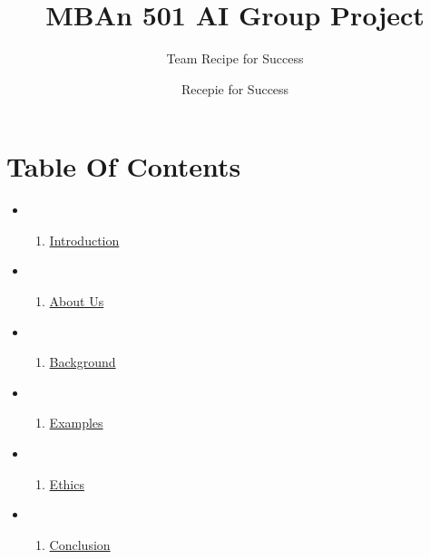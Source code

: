 \documentclass[
]{article}
\title{MBAn 501 AI Group Project}
\subtitle{Team Recipe for Success}
\author{Recepie for Success}
\date{}
\providecommand{\tightlist}{%
  \setlength{\itemsep}{0pt}\setlength{\parskip}{0pt}}
\begin{document}
\maketitle

{
\setcounter{tocdepth}{2}
\tableofcontents
}
\hypertarget{table-of-contents}{%
\section{Table Of Contents}\label{table-of-contents}}

\begin{itemize}
\item
  \begin{enumerate}
  \def\labelenumi{\arabic{enumi}.}
  \tightlist
  \item
    \href{01-Intro.Rmd}{Introduction}
  \end{enumerate}
\item
  \begin{enumerate}
  \def\labelenumi{\arabic{enumi}.}
  \setcounter{enumi}{1}
  \tightlist
  \item
    \href{02-About-Us.Rmd}{About Us}
  \end{enumerate}
\item
  \begin{enumerate}
  \def\labelenumi{\arabic{enumi}.}
  \setcounter{enumi}{2}
  \tightlist
  \item
    \href{03-Background.Rmd}{Background}
  \end{enumerate}
\item
  \begin{enumerate}
  \def\labelenumi{\arabic{enumi}.}
  \setcounter{enumi}{3}
  \tightlist
  \item
    \href{04-Examples.Rmd}{Examples}
  \end{enumerate}
\item
  \begin{enumerate}
  \def\labelenumi{\arabic{enumi}.}
  \setcounter{enumi}{4}
  \tightlist
  \item
    \href{05-Ethics.Rmd}{Ethics}
  \end{enumerate}
\item
  \begin{enumerate}
  \def\labelenumi{\arabic{enumi}.}
  \setcounter{enumi}{5}
  \tightlist
  \item
    \href{06-Conclusion.Rmd}{Conclusion}
  \end{enumerate}
\end{itemize}
\end{document}
